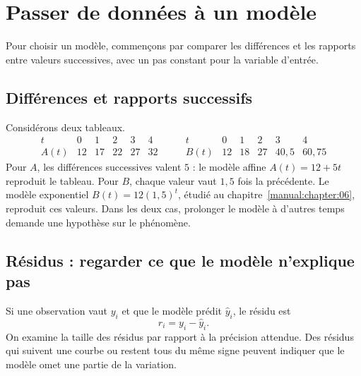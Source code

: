 \section{Passer de données à un modèle}
\label{manual:section:04.06}

Pour choisir un modèle, commençons par comparer les différences et les rapports entre valeurs successives, avec un pas constant pour la variable d'entrée.

\subsection{Différences et rapports successifs}
Considérons deux tableaux.
\[
\begin{array}{c|ccccc}
t&0&1&2&3&4\\\hline
A(t)&12&17&22&27&32
\end{array}
\qquad
\begin{array}{c|ccccc}
t&0&1&2&3&4\\\hline
B(t)&12&18&27&40{,}5&60{,}75
\end{array}
\]
Pour $A$, les différences successives valent $5$ : le modèle affine $A(t)=12+5t$ reproduit le tableau. Pour $B$, chaque valeur vaut $1{,}5$ fois la précédente. Le modèle exponentiel $B(t)=12(1{,}5)^t$, étudié au chapitre~\ref{manual:chapter:06}, reproduit ces valeurs. Dans les deux cas, prolonger le modèle à d'autres temps demande une hypothèse sur le phénomène.

\subsection{Résidus : regarder ce que le modèle n'explique pas}
Si une observation vaut $y_i$ et que le modèle prédit $\widehat y_i$, le résidu est
\[
r_i=y_i-\widehat y_i.
\]
On examine la taille des résidus par rapport à la précision attendue. Des résidus qui suivent une courbe ou restent tous du même signe peuvent indiquer que le modèle omet une partie de la variation.

\begin{center}
\end{center}

